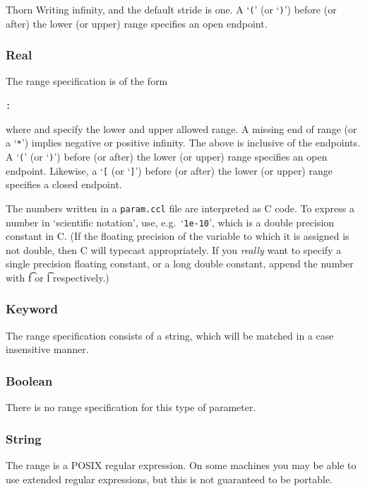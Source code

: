 \begin{cactuspart}{Thorn Writing}
infinity, and the default stride is one.
A `\texttt{(}' (or `\texttt{)}') before (or after) the lower (or upper) range specifies an open
endpoint.

\subsubsection{Real}

The range specification is of the form
\begin{alltt}
:
\end{alltt}
where  and  specify the lower and upper allowed
range.  A missing end of range (or a `\texttt{*}') implies negative or positive
infinity.  The above is inclusive of the endpoints.
A `\texttt{(}' (or `\texttt{)}') before (or after) the lower (or upper) range specifies an open
endpoint.
Likewise, a `\texttt{[} (or `\texttt{]}') before (or after) the lower
(or upper) range specifies a closed endpoint.

The numbers written in a \texttt{param.ccl} file are interpreted as C code.
To express a number in `scientific notation', use,
e.g.\ `\texttt{1e-10}', which is a double precision constant in C.  (If the
floating precision of the variable to which it is assigned is not
double, then C will typecast appropriately.  If you \emph{really} want to
specify a single precision floating constant, or a long double
constant, append the number with {\t f} or {\t l} respectively.)

\subsubsection{Keyword}

The range specification consists of a string, which will be matched in
a case insensitive manner.

\subsubsection{Boolean}

There is no range specification for this type of parameter.

\subsubsection{String}

The range is a POSIX regular expression.  On some machines you may be
able to use extended regular expressions, but this is not guaranteed
to be portable.


\end{cactuspart}
